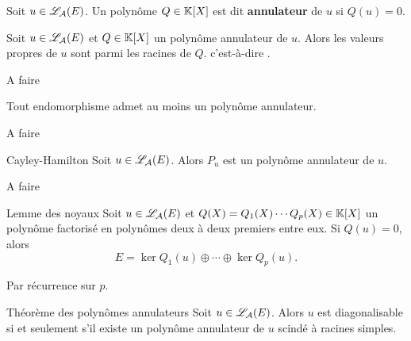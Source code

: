 \documentclass[a4paper, 12pt]{article}
\begin{document}
\begin{definition}
    Soit $u \in \mathscr{L}_\mathcal{A}(E)$. Un polynôme $Q \in \mathbb{K}[X]$ est dit \textbf{annulateur} de $u$ si
    $Q(u) = 0$.
\end{definition}

\begin{proposition}{}{}
    Soit $u \in \mathscr{L}_\mathcal{A}(E)$ et $Q \in \mathbb{K}[X]$ un polynôme annulateur de $u$. Alors
    les valeurs propres de $u$ sont parmi les racines de $Q$.
    c'est-à-dire .
\end{proposition}

\begin{demonstration}
    \begin{hotwarn}
        A faire
    \end{hotwarn}
\end{demonstration}

\begin{proposition}{}{}
    Tout endomorphisme admet au moins un polynôme annulateur.
\end{proposition}

\begin{demonstration}
    \begin{hotwarn}
        A faire
    \end{hotwarn}
\end{demonstration}

\begin{theoreme}{Cayley-Hamilton}{}
    Soit $u \in \mathscr{L}_\mathcal{A}(E)$. Alors $P_u$ est un polynôme annulateur de $u$.
\end{theoreme}

\begin{demonstration}
    \begin{hotwarn}
        A faire
    \end{hotwarn}
\end{demonstration}

\begin{lemme}{Lemme des noyaux}{}
    Soit $u \in \mathscr{L}_\mathcal{A}(E)$ et $Q(X) = Q_1(X) \cdots Q_p(X) \in \mathbb{K}[X]$ un polynôme factorisé en polynômes deux à deux premiers entre eux.
    \n Si $Q(u) = 0$, alors
    \[
        E = \ker Q_1(u) \oplus \cdots \oplus \ker Q_p(u).
    \]
\end{lemme}

\begin{demonstration}
    Par récurrence sur $p$.
\end{demonstration}

\begin{theoreme}{Théorème des polynômes annulateurs}{}
    Soit $u \in \mathscr{L}_\mathcal{A}(E)$. Alors $u$ est diagonalisable si et seulement s'il existe un polynôme annulateur de $u$ scindé à racines simples.
\end{theoreme}
\end{document}
